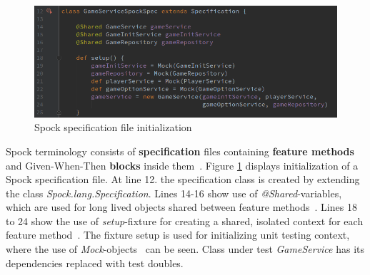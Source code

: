     \begin{figure}[ht]
      \begin{center}
        \includegraphics[width=13.7cm]{images/spock-init.png}
        \caption{Spock specification file initialization}
        \label{fig:spock-init}
      \end{center}
    \end{figure}

    Spock terminology consists of \textbf{specification} files containing \textbf{feature methods} and Given-When-Then
    \textbf{blocks} inside them~\cite{spock}. Figure \ref{fig:spock-init} displays initialization of a Spock specification
    file. At line 12. the specification class is created by extending the class \textit{Spock.lang.Specification}. Lines
    14-16 show use of \textit{@Shared}-variables, which are used for long lived objects shared between feature methods~\cite{spock}.
    Lines 18 to 24 show the use of \textit{setup}-fixture for creating a shared, isolated context for each feature method~\cite{spock}.
    The fixture setup is used for initializing unit testing context, where the use of \textit{Mock}-objects~\cite{spock} can be seen.
    Class under test \textit{GameService} has its dependencies replaced with test doubles.

